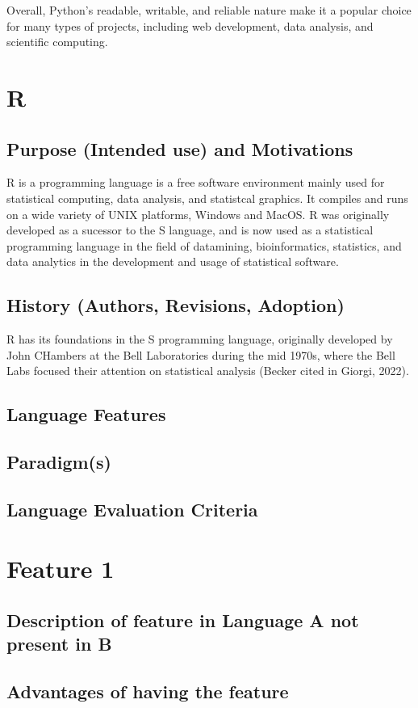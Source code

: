 \documentclass{article}
\begin{document}
Overall, Python's readable, writable, and reliable nature make it a popular choice for many types of projects, including web development, data analysis, and scientific computing. 
\section*{R}
\subsection*{Purpose (Intended use) and Motivations}
R is a programming language is a free software environment mainly used for statistical computing, data analysis, and statistcal graphics. It compiles and runs on a wide variety of UNIX platforms, Windows and MacOS. R was originally developed as a sucessor to the S language, and is now used as a statistical programming language in the field of datamining, bioinformatics, statistics, and data analytics in the development and usage of statistical software.

\subsection*{History (Authors, Revisions, Adoption)}
R has its foundations in the S programming language, originally developed by John CHambers at the Bell Laboratories during the mid 1970s, where the Bell Labs focused their attention on statistical analysis (Becker cited in Giorgi, 2022). 
\subsection*{Language Features}
\subsection*{Paradigm(s)}
\subsection*{Language Evaluation Criteria}

\section*{Feature 1}
\subsection*{Description of feature in Language A not present in B}
\subsection*{Advantages of having the feature}
\end{document}
